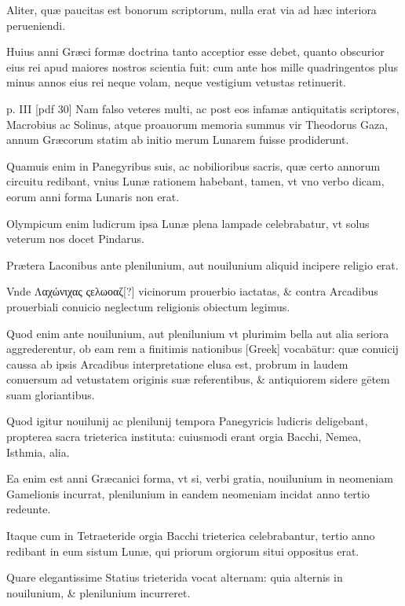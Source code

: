 \begin{parnumbers}
Aliter, quæ paucitas est bonorum scriptorum,
nulla erat via ad hæc interiora perueniendi.

Huius anni Græci
formæ doctrina tanto acceptior esse debet, quanto obscurior eius
rei apud maiores nostros scientia fuit: cum ante hos mille quadringentos
plus minus annos eius rei neque volam, neque vestigium
vetustas retinuerit.

\clearpage
p. III [pdf 30]
Nam falso veteres multi, ac post eos infamæ antiquitatis
scriptores, Macrobius ac Solinus, atque proauorum memoria
summus vir Theodorus Gaza, annum Græcorum statim
ab initio merum Lunarem fuisse prodiderunt.

Quamuis enim in
Panegyribus suis, ac nobilioribus sacris, quæ certo annorum circuitu
redibant, vnius Lunæ rationem habebant, tamen, vt vno verbo
dicam, eorum anni forma Lunaris non erat.

Olympicum enim ludicrum
ipsa Lunæ plena lampade celebrabatur, vt solus veterum nos
docet Pindarus. 

Prætera Laconibus ante plenilunium, aut nouilunium
aliquid incipere religio erat.

Vnde \textgreek{Λαχώνιχας ςελωοαζ}[?] vicinorum
prouerbio iactatas, \& contra Arcadibus prouerbiali conuicio
neglectum religionis obiectum legimus. 

Quod enim ante nouilunium,
aut plenilunium vt plurimim bella aut alia seriora aggrederentur,
ob eam rem a finitimis nationibus \textgreek{[Greek]} vocabātur:
quæ conuicij caussa ab ipsis Arcadibus interpretatione elusa est,
probrum in laudem conuersum ad vetustatem originis suæ referentibus,
\& antiquiorem sidere gētem suam gloriantibus. 

Quod igitur
nouilunij ac plenilunij tempora Panegyricis ludicris deligebant,
propterea sacra trieterica instituta: cuiusmodi erant orgia Bacchi,
Nemea, Isthmia, alia.

Ea enim est anni Græcanici forma, vt si, verbi
gratia, nouilunium in neomeniam Gamelionis incurrat, plenilunium
in eandem neomeniam incidat anno tertio redeunte.

Itaque
cum in Tetraeteride orgia Bacchi trieterica celebrabantur, tertio
anno redibant in eum sistum Lunæ, qui priorum orgiorum situi oppositus
erat.

Quare elegantissime Statius trieterida vocat alternam:
quia alternis in nouilunium, \& plenilunium incurreret.


\end{parnumbers}
